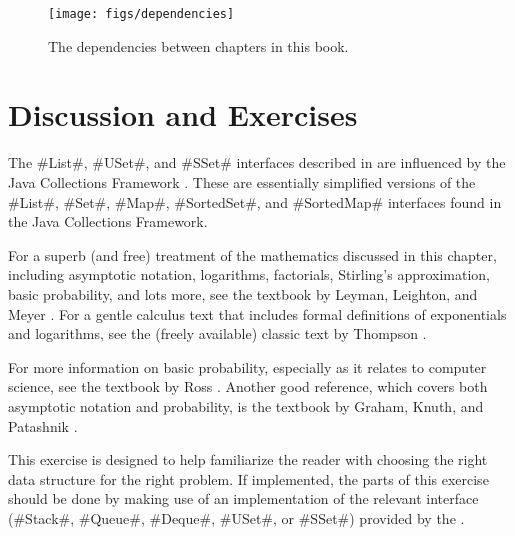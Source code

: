 {{{{{{{{{\begin{figure}
  \begin{center}
    \texttt{[image: figs/dependencies]}
  \end{center}
  \caption{The dependencies between chapters in this book.}
\end{figure}

\section{Discussion and Exercises}

The #List#, #USet#, and #SSet# interfaces described in  are influenced by the Java Collections Framework \cite{oracle_collections}.   These are essentially simplified versions of the #List#, #Set#, #Map#, #SortedSet#, and #SortedMap# interfaces found in the Java Collections Framework.  

For a superb (and free) treatment of the mathematics discussed in this chapter, including asymptotic notation, logarithms, factorials, Stirling's approximation, basic probability, and lots more, see the textbook by Leyman, Leighton, and Meyer \cite{llm11}.  For a gentle calculus text that includes formal definitions of exponentials and logarithms, see the (freely available) classic text by Thompson \cite{t14}.

For more information on basic probability, especially as it relates to computer science, see the textbook by Ross \cite{r01}.  Another good reference, which covers both asymptotic notation and probability, is the textbook by Graham, Knuth, and Patashnik \cite{gkp94}.


\begin{exc}
  This exercise is designed to help familiarize the reader with choosing the right data structure for the right problem.  If implemented, the parts of this exercise should be done by making use of an implementation of the relevant interface (#Stack#, #Queue#, #Deque#, #USet#, or #SSet#) provided by the .


\end{exc}}}}}}}}}}
